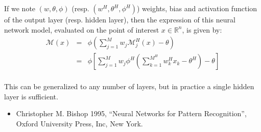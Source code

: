 {If we note $(w,\theta,\phi)$ (resp. $(w^H,\theta^H,\phi^H)$) weights, bias and activation function of the output layer (resp. hidden layer), then
the expression of this neural network model, evaluated on the point of interest $x\in \mathbb{R}^n$, is given by:
\begin{eqnarray*}
\mathcal{M}(x) &=& \phi\left( \sum_{j=1}^M{w_j \mathcal{M}^H_j(x) - \theta} \right) \\
     &=& \phi\left[ \sum_{j=1}^M{w_j \phi^H\left(\sum_{k=1}^{M^H}{w^H_k x_k - \theta^H}\right) - \theta} \right] \\
\end{eqnarray*}

This can be generalized to any number of layers, but in practice a single hidden layer is sufficient.
}

{
}

{

\vspace{1mm}

\begin{itemize}
\item Christopher M. Bishop 1995, ``Neural Networks for Pattern Recognition'', Oxford University Press, Inc, New York.
\end{itemize}
}

